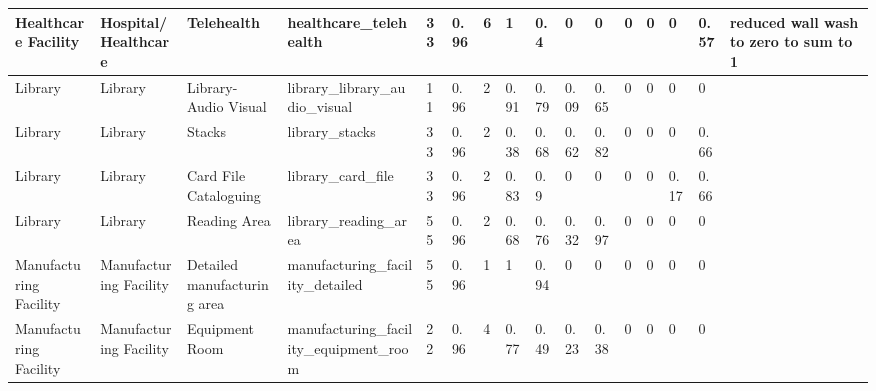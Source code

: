 \begin{center}
\begin{landscape}
\begin{longtable}{|p{0.75in}|p{0.75in}|p{0.75in}|p{0.75in}|p{0.3in}|p{0.3in}|p{0.3in}|p{0.3in}|p{0.3in}|p{0.3in}|p{0.3in}|p{0.3in}|p{0.3in}|p{0.3in}|p{0.3in}|p{0.6in}|}
      Healthcare Facility                     & Hospital/Healthcare         & Telehealth                                      & healthcare\_telehealth                                          & 33   & 0.96 & 6  & 1      & 0.4   & 0     & 0     & 0    & 0    & 0    & 0.57 & reduced wall wash to zero to sum to 1                                                 \\ \hline
      Library                                 & Library                     & Library-Audio Visual                            & library\_library\_audio\_visual                                 & 11   & 0.96 & 2  & 0.91   & 0.79  & 0.09  & 0.65  & 0    & 0    & 0    & 0    &                                                                                       \\ \hline
      Library                                 & Library                     & Stacks                                          & library\_stacks                                                 & 33   & 0.96 & 2  & 0.38   & 0.68  & 0.62  & 0.82  & 0    & 0    & 0    & 0.66 &                                                                                       \\ \hline
      Library                                 & Library                     & Card File  Cataloguing                          & library\_card\_file                                             & 33   & 0.96 & 2  & 0.83   & 0.9   & 0     & 0     & 0    & 0    & 0.17 & 0.66 &                                                                                       \\ \hline
      Library                                 & Library                     & Reading Area                                    & library\_reading\_area                                          & 55   & 0.96 & 2  & 0.68   & 0.76  & 0.32  & 0.97  & 0    & 0    & 0    & 0    &                                                                                       \\ \hline
      Manufacturing Facility                  & Manufacturing Facility      & Detailed manufacturing area                     & manufacturing\_facility\_detailed                               & 55   & 0.96 & 1  & 1      & 0.94  & 0     & 0     & 0    & 0    & 0    & 0    &                                                                                       \\ \hline
      Manufacturing Facility                  & Manufacturing Facility      & Equipment Room                                  & manufacturing\_facility\_equipment\_room                        & 22   & 0.96 & 4  & 0.77   & 0.49  & 0.23  & 0.38  & 0    & 0    & 0    & 0    &                                                                                       \\ \hline

\end{longtable}
\end{landscape}
\end{center}
